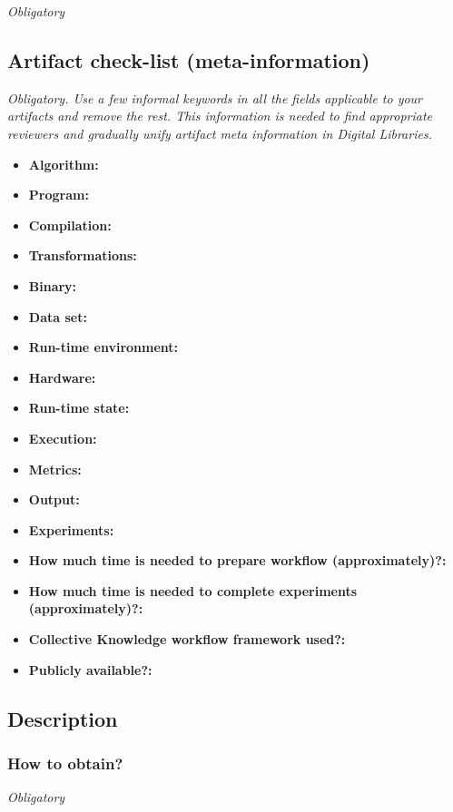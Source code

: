 \documentclass{sigplanconf}
\begin{document}
{\em Obligatory}

\subsection{Artifact check-list (meta-information)}

{\em Obligatory. Use a few informal keywords in all the fields applicable to your artifacts
and remove the rest. This information is needed to find appropriate reviewers and gradually 
unify artifact meta information in Digital Libraries.}

{\small
\begin{itemize}
  \item {\bf Algorithm: }
  \item {\bf Program: }
  \item {\bf Compilation: }
  \item {\bf Transformations: }
  \item {\bf Binary: }
  \item {\bf Data set: }
  \item {\bf Run-time environment: }
  \item {\bf Hardware: }
  \item {\bf Run-time state: }
  \item {\bf Execution: }
  \item {\bf Metrics: }
  \item {\bf Output: }
  \item {\bf Experiments: }
  \item {\bf How much time is needed to prepare workflow (approximately)?: }
  \item {\bf How much time is needed to complete experiments (approximately)?: }
  \item {\bf Collective Knowledge workflow framework used?: } 
  \item {\bf Publicly available?: }
\end{itemize}

\subsection{Description}

\subsubsection{How to obtain?}

{\em Obligatory}

}
\end{document}
